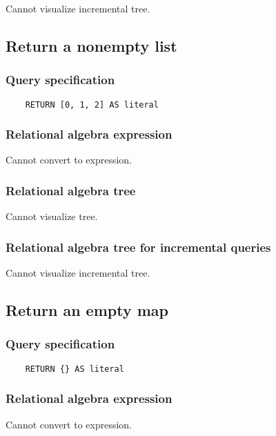 	Cannot visualize incremental tree.
	\subsection{Return a nonempty list}

	\subsubsection*{Query specification}

	\begin{lstlisting}
	RETURN [0, 1, 2] AS literal
	\end{lstlisting}


	\subsubsection*{Relational algebra expression}

	Cannot convert to expression.

	\subsubsection*{Relational algebra tree}

	Cannot visualize tree.

	\subsubsection*{Relational algebra tree for incremental queries}

	Cannot visualize incremental tree.
	\subsection{Return an empty map}

	\subsubsection*{Query specification}

	\begin{lstlisting}
	RETURN {} AS literal
	\end{lstlisting}


	\subsubsection*{Relational algebra expression}

	Cannot convert to expression.

